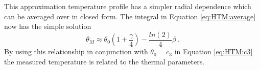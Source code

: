 This approximation temperature profile has a simpler radial dependence which can be averaged over in closed form.
The integral in Equation \ref{eq:HTM:average} now has the simple solution
\begin{equation}
	\theta_M \approx \theta_0(1+\frac{\gamma}{4})-\frac{ln(2)}{4} \beta \ .
\end{equation}
By using this relationship in conjunction with $\theta_0=c_3$ in Equation \ref{eq:HTM:c3} the measured temperature is related to the thermal parameters.